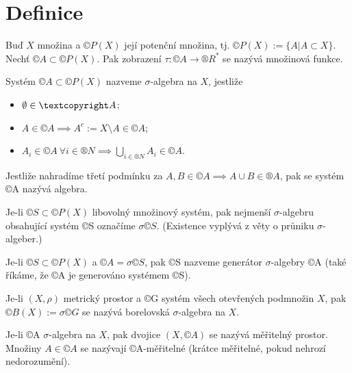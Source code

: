 \documentclass[12pt]{article}					%
\begin{document}

\part{Definice}
\begin{definice}
	Buď $X$ množina a $©P(X)$ její potenční množina, tj. $©P(X) := \{A | A \subset X\}$. Nechť $©A \subset ©P(X)$. Pak zobrazení $\tau: ©A \rightarrow ®R^*$ se nazývá množinová funkce.
\end{definice}

\begin{definice}
	Systém $©A \subset ©P(X)$ nazveme $\sigma$-algebra na $X$, jestliže

	\begin{itemize}
		\item $\O \in ©A$;
		\item $A \in ©A \implies A^c := X \setminus A \in ©A$;
		\item $A_i \in ©A\ \forall i \in ®N \implies \bigcup_{i \in ®N} A_i \in ©A$.
	\end{itemize}

	Jestliže nahradíme třetí podmínku za $A, B \in ©A \implies A \cup B \in ®A$, pak se systém ©A nazývá algebra.
\end{definice}

\begin{definice}[$\sigma ©S$]
	Je-li $©S \subset ©P(X)$ libovolný množinový systém, pak nejmenší $\sigma$-algebru obsahující systém ©S označíme $\sigma ©S$. (Existence vyplývá z věty o průniku $\sigma$-algeber.)
\end{definice}

\begin{definice}
	Je-li $©S \subset ©P(X)$ a $©A = \sigma ©S$, pak ©S nazveme generátor $\sigma$-algebry ©A (také říkáme, že ©A je generováno systémem ©S).
\end{definice}

\begin{definice}
	Je-li $(X, \rho)$ metrický prostor a ©G systém všech otevřených podmnožin $X$, pak $©B(X) := \sigma ©G$ se nazývá borelovská $\sigma$-algebra na $X$.
\end{definice}

\begin{definice}
	Je-li ©A $\sigma$-algebra na $X$, pak dvojice $(X, ©A)$ se nazývá měřitelný prostor. Množiny $A \in ©A$ se nazývají ©A-měřitelné (krátce měřitelné, pokud nehrozí nedorozumění).
\end{definice}
\end{document}
